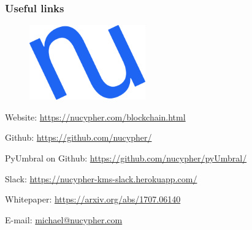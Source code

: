 \documentclass[xetex,mathsans,sans,aspectratio=169]{beamer}
\begin{document}
    \begin{frame}
        \frametitle{Useful links}
        \begin{figure}
            \centering
            \includegraphics[width=5cm]{pdf/nucypher_logo.pdf}
        \end{figure}
        Website: \url{https://nucypher.com/blockchain.html}

        Github: \url{https://github.com/nucypher/}

        PyUmbral on Github: \url{https://github.com/nucypher/pyUmbral/}

        Slack: \url{https://nucypher-kms-slack.herokuapp.com/}

        Whitepaper: \url{https://arxiv.org/abs/1707.06140}

        E-mail: \url{michael@nucypher.com}
    \end{frame}
\end{document}

